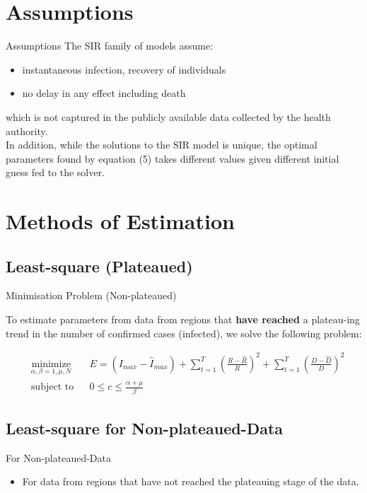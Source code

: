 \documentclass{beamer}
\begin{document}
\section{Assumptions}
\begin{frame}{Assumptions}
The SIR family of models assume:
\begin{itemize}
	\item instantaneous infection, recovery of individuals
	\item no delay in any effect including death
\end{itemize}
which is not captured in the publicly available data collected by the health authority. \\

\bigskip 
In addition, while the solutions to the SIR model is unique, the optimal parameters found by equation (5) takes different values given different initial guess fed to the solver. 

\end{frame}



\section{Methods of Estimation}

\subsection{Least-square (Plateaued)}
\begin{frame}{Minimisation Problem (Non-plateaued)}

To estimate parameters from data from regions that \textbf{have reached} a plateau-ing trend in the number of confirmed cases (infected), we solve the following problem: 

\begin{equation}
\begin{aligned}
& \underset{\alpha, \beta=1, \mu, N}{\text{minimize}} & &  E = (I_{max} - \widehat{I}_{max}) + \sum_{t=1}^{T} (\frac{R - \widehat{R}}{R})^2 + \sum_{t=1}^{T} (\frac{D - \widehat{D}}{D})^2 \\
& \text{subject to}
& & 0 \leq c \leq \frac{\alpha + \mu}{\beta}
 \end{aligned}
\end{equation}

\end{frame}

\subsection{Least-square for Non-plateaued-Data}
\begin{frame}{For Non-plateaued-Data}
	\begin{itemize}
	\item For data from regions that have not reached the plateauing stage of the data. 
	\end{itemize}
\end{frame}
\end{document}
